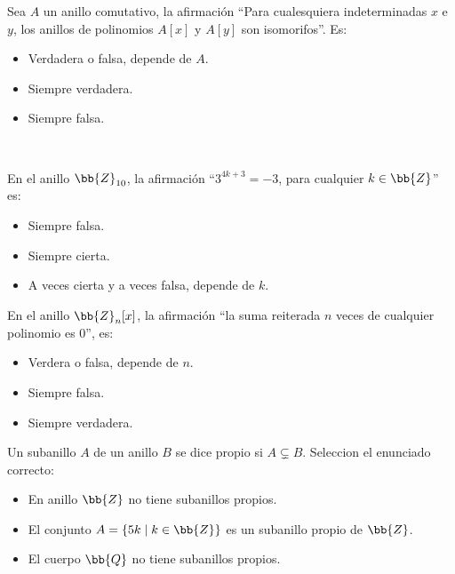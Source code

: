 \begin{ejercicio}
    Sea $A$ un anillo comutativo, la afirmación ``Para cualesquiera indeterminadas $x$ e $y$, los anillos de polinomios $A[x]$ y $A[y]$ son isomorifos''. Es:
    \begin{itemize}
        \item Verdadera o falsa, depende de $A$.
        \item Siempre verdadera.
        \item Siempre falsa.
    \end{itemize}
\end{ejercicio}

\newpage
\ %
\resetearcontador

\begin{ejercicio}
    En el anillo $\bb{Z}_{10}$, la afirmación ``$3^{4k+3} = -3$, para cualquier $k \in \bb{Z}$'' es:
    \begin{itemize}
        \item Siempre falsa.
        \item Siempre cierta.
        \item A veces cierta y a veces falsa, depende de $k$.
    \end{itemize}
\end{ejercicio}

\begin{ejercicio}
    En el anillo $\bb{Z}_n[x]$, la afirmación ``la suma reiterada $n$ veces de cualquier polinomio es $0$'', es:
    \begin{itemize}
        \item Verdera o falsa, depende de $n$.
        \item Siempre falsa.
        \item Siempre verdadera.
    \end{itemize}
\end{ejercicio}

\begin{ejercicio}
    Un subanillo $A$ de un anillo $B$ se dice propio si $A \subsetneq B$. Seleccion el enunciado correcto:
    \begin{itemize}
        \item En anillo $\bb{Z}$ no tiene subanillos propios.
        \item El conjunto $A = \{ 5k \mid k \in \bb{Z} \}$ es un subanillo propio de $\bb{Z}$.
        \item El cuerpo $\bb{Q}$ no tiene subanillos propios.
    \end{itemize}
\end{ejercicio}

